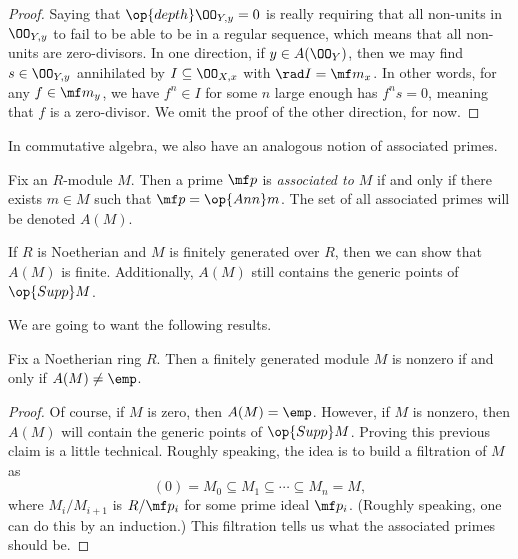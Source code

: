\documentclass[../notes.tex]{subfiles}
\begin{document}
\begin{proof}
	Saying that $\op{depth}\OO_{Y,y}=0$ is really requiring that all non-units in $\OO_{Y,y}$ to fail to be able to be in a regular sequence, which means that all non-units are zero-divisors. In one direction, if $y\in A(\OO_Y)$, then we may find $s\in\OO_{Y,y}$ annihilated by $I\subseteq\OO_{X,x}$ with $\rad I=\mf m_x$. In other words, for any $f\in\mf m_y$, we have $f^n\in I$ for some $n$ large enough has $f^ns=0$, meaning that $f$ is a zero-divisor. We omit the proof of the other direction, for now.
\end{proof}
In commutative algebra, we also have an analogous notion of associated primes.
\begin{definition}
	Fix an $R$-module $M$. Then a prime $\mf p$ is \textit{associated to $M$} if and only if there exists $m\in M$ such that $\mf p=\op{Ann}m$. The set of all associated primes will be denoted $A(M)$.
\end{definition}
\begin{remark}
	If $R$ is Noetherian and $M$ is finitely generated over $R$, then we can show that $A(M)$ is finite. Additionally, $A(M)$ still contains the generic points of $\op{Supp}M$.
\end{remark}
We are going to want the following results.
\begin{lemma}
	Fix a Noetherian ring $R$. Then a finitely generated module $M$ is nonzero if and only if $A(M)\ne\emp$.
\end{lemma}
\begin{proof}
	Of course, if $M$ is zero, then $A(M)=\emp$. However, if $M$ is nonzero, then $A(M)$ will contain the generic points of $\op{Supp}M$. Proving this previous claim is a little technical. Roughly speaking, the idea is to build a filtration of $M$ as
	\[(0)=M_0\subseteq M_1\subseteq\cdots\subseteq M_n=M,\]
	where $M_i/M_{i+1}$ is $R/\mf p_i$ for some prime ideal $\mf p_i$. (Roughly speaking, one can do this by an induction.) This filtration tells us what the associated primes should be.
\end{proof}
\end{document}
